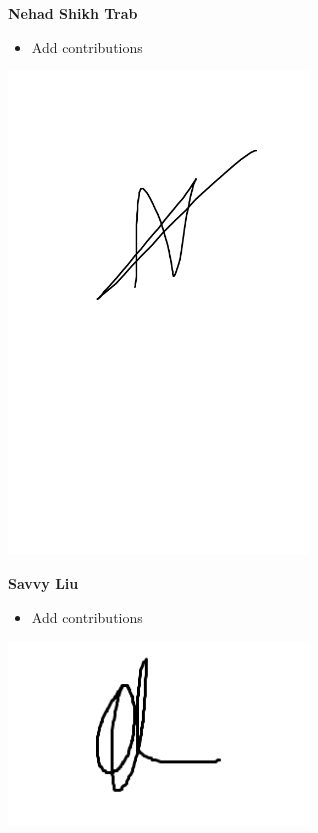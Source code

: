 \documentclass[]{article}
\begin{document}
\textbf{Nehad Shikh Trab}
\begin{itemize}
    \setlength\itemindent{2em}
\item Add contributions 
\end{itemize}
\includegraphics[width=0.6\textwidth]{Nehad.png}

\textbf{Savvy Liu}
\begin{itemize}
\setlength\itemindent{2em}
\item Add contributions 
\end{itemize} 
\includegraphics[width=0.6\textwidth]{Savvy.png}
\end{document}
